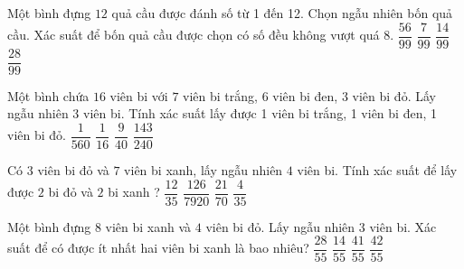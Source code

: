 \begin{ex}
Một bình đựng $12$ quả cầu được đánh số từ 1 đến 12. Chọn ngẫu nhiên bốn quả cầu. Xác suất để bốn quả cầu được chọn có số đều không vượt quá 8.
\choice
{$\dfrac{56}{99}$}
{$\dfrac{7}{99}$}
{\True $\dfrac{14}{99}$}
{$\dfrac{28}{99}$}
\end{ex}
\begin{ex}
Một bình chứa $16$ viên bi với $7$ viên bi trắng, $6$ viên bi đen, 3 viên bi đỏ. Lấy ngẫu nhiên 3 viên bi. Tính xác suất lấy được 1 viên bi trắng, 1 viên bi đen, 1 viên bi đỏ.
\choice
{$\dfrac{1}{560}$}
{$\dfrac{1}{16}$}
{\True $\dfrac{9}{40}$}
{$\dfrac{143}{240}$}
\end{ex}
\begin{ex}
Có $3$ viên bi đỏ và $7$ viên bi xanh, lấy ngẫu nhiên $4$ viên bi. Tính xác suất để lấy được $2$ bi đỏ và $2$ bi xanh ?
\choice
{$\dfrac{12}{35}$}
{$\dfrac{126}{7920}$}
{\True $\dfrac{21}{70}$}
{$\dfrac{4}{35}$}
\end{ex}
\begin{ex}
Một bình đựng $8$ viên bi xanh và $4$ viên bi đỏ. Lấy ngẫu nhiên $3$ viên bi. Xác suất để có được ít nhất hai viên bi xanh là bao nhiêu?
\choice
{$\dfrac{28}{55}$}
{$\dfrac{14}{55}$}
{$\dfrac{41}{55}$}
{\True $\dfrac{42}{55}$}
\end{ex}
